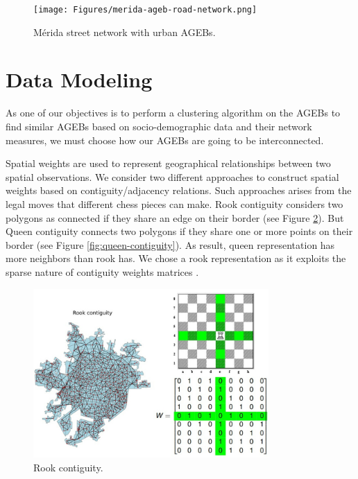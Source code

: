 \begin{figure}[htpb]
  \centering
 \texttt{[image: Figures/merida-ageb-road-network.png]}
  \caption{Mérida street network with urban AGEBs.
    \label{fig:merida-ageb-street-network}}
\end{figure}

\section{Data Modeling}

As one of our objectives is to perform a clustering algorithm on the AGEBs to find similar AGEBs based on socio-demographic data and their network measures, we must choose how our AGEBs are going to be interconnected.

Spatial weights are used to represent geographical relationships between two spatial observations. We consider two different approaches to construct spatial weights based on contiguity/adjacency relations. Such approaches arises from the legal moves that different chess pieces can make. Rook contiguity considers two polygons as connected if they share an edge on their border (see Figure \ref{fig:rook-contiguity}). But Queen contiguity connects two polygons if they share one or more points on their border (see Figure \ref{fig:queen-contiguity}). As result, queen representation has more neighbors than rook has. We chose a rook representation as it exploits the sparse nature of contiguity weights matrices \cite{rey_geo_ds_2020}.

\begin{figure}[htpb]
  \centering
  \includegraphics[width=0.8\textwidth]{Figures/rook-contiguity.jpg}
  \caption{Rook contiguity.
    \label{fig:rook-contiguity}}
\end{figure}

